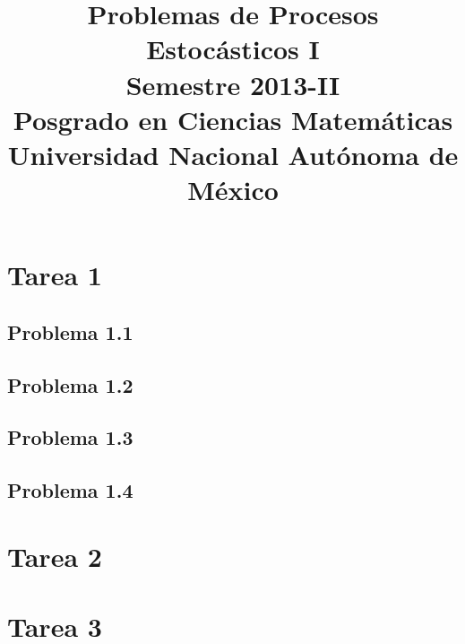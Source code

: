 \documentclass[a5paper,oneside]{amsart}
\title[Problemas de Procesos I]{Problemas de Procesos Estocásticos I\\ Semestre 2013-II\\ Posgrado en Ciencias Matemáticas\\ Universidad Nacional Autónoma de México}
\theoremstyle{dotless}
\begin{document}
	\maketitle
	\section{Tarea 1}
	
		\subsection{Problema 1.1}
		
		
		\subsection{Problema 1.2}
		
		
		\subsection{Problema 1.3}
		
		
		\subsection{Problema 1.4}
		
		
		\nqed
		
	\section{Tarea 2}

		
		
		\nqed
		
	\section{Tarea 3}

		

		
		
		\nqed
		
	
	
\end{document}
